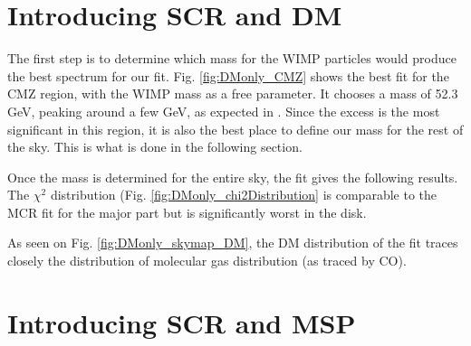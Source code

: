 \section{Introducing SCR and DM}
%

%
%

The first step is to determine which mass for the WIMP particles would produce the best spectrum for our fit. Fig. \ref{fig:DMonly_CMZ} shows the best fit for the CMZ region, with the WIMP mass as a free parameter. It chooses a mass of 52.3 GeV, peaking around a few GeV, as expected in . Since the excess is the most significant in this region, it is also the best place to define our mass for the rest of the sky. This is what is done in the following section.


Once the mass is determined for the entire sky, the fit gives the following results. The $\chi^2$ distribution (Fig. \ref{fig:DMonly_chi2Distribution} is comparable to the MCR fit for the major part but is significantly worst in the disk.


As seen on Fig. \ref{fig:DMonly_skymap_DM}, the DM distribution of the fit traces closely the distribution of molecular gas distribution (as traced by CO).

\section{Introducing SCR and MSP}
%

